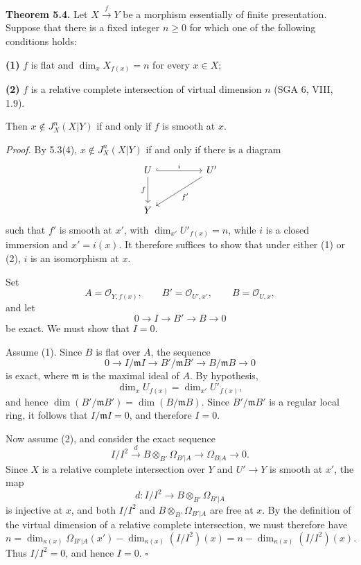 \medskip
\noindent\textbf{Theorem 5.4.}
Let $X\xrightarrow{f}Y$ be a morphism essentially of finite
presentation. Suppose that there is a fixed integer $n\geq0$ for
which one of the following conditions holds:

\smallskip
\noindent\textbf{(1)} $f$ is flat and
$\dim_xX_{f(x)}=n$ for every $x\in X$;

\smallskip
\noindent\textbf{(2)} $f$ is a relative complete intersection of
virtual dimension $n$ (SGA 6, VIII, 1.9).

\smallskip
Then $x\notin J_X^n(X|Y)$ if and only if $f$ is smooth at $x$.

\smallskip
\noindent\textit{Proof.}
By 5.3(4), $x\notin J_X^n(X|Y)$ if and only if there is a diagram
\[
\begin{tikzcd}[column sep=huge,row sep=large]
U \arrow[r,hook,"i"] \arrow[d,"f"']
  & U' \arrow[dl,"f'"] \\
Y & {}
\end{tikzcd}
\]
such that $f'$ is smooth at $x'$, with
$\dim_{x'}U'_{f(x)}=n$, while $i$ is a closed immersion and
$x'=i(x)$. It therefore suffices to show that under either (1) or
(2), $i$ is an isomorphism at $x$.

Set
\[
A=\mathcal O_{Y,f(x)},\qquad
B'=\mathcal O_{U',x'},\qquad B=\mathcal O_{U,x},
\]
and let
\[
0\longrightarrow I\longrightarrow B'\longrightarrow B
\longrightarrow0
\]
be exact. We must show that $I=0$.

Assume (1). Since $B$ is flat over $A$, the sequence
\[
0\longrightarrow I/\mathfrak mI
\longrightarrow B'/\mathfrak mB'
\longrightarrow B/\mathfrak mB\longrightarrow0
\]
is exact, where $\mathfrak m$ is the maximal ideal of $A$. By
hypothesis,
\[
\dim_xU_{f(x)}=\dim_{x'}U'_{f(x)},
\]
and hence
$\dim(B'/\mathfrak mB')=\dim(B/\mathfrak mB)$. Since
$B'/\mathfrak mB'$ is a regular local ring, it follows that
$I/\mathfrak mI=0$, and therefore $I=0$.


Now assume (2), and consider the exact sequence
\[
I/I^2\xrightarrow{d}B\otimes_{B'}\Omega_{B'|A}
\longrightarrow\Omega_{B|A}\longrightarrow0.
\]
Since $X$ is a relative complete intersection over $Y$ and
$U'\longrightarrow Y$ is smooth at $x'$, the map
\[
d:I/I^2\longrightarrow B\otimes_{B'}\Omega_{B'|A}
\]
is injective at $x$, and both $I/I^2$ and
$B\otimes_{B'}\Omega_{B'|A}$ are free at $x$. By the definition of
the virtual dimension of a relative complete intersection, we must
therefore have
\[
n=\dim_{\kappa(x)}\Omega_{B'|A}(x')
  -\dim_{\kappa(x)}(I/I^2)(x)
 =n-\dim_{\kappa(x)}(I/I^2)(x).
\]
Thus $I/I^2=0$, and hence $I=0$. \hfill$\square$
